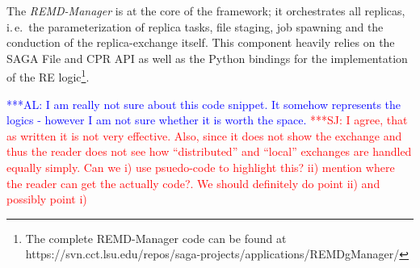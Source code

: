 \documentclass{rspublic}
\newcommand{\alnote}[1]{ {\textcolor{blue} { ***AL: #1 }}}
\newcommand{\jhanote}[1]{ {\textcolor{red} { ***SJ: #1 }}}
\newcommand{\alnote}[1]{}
\newcommand{\jhanote}[1]{}
\begin{document}
The \emph{REMD-Manager} is at the core of the framework; it
orchestrates all replicas, i.\,e.\ the parameterization of replica
tasks, file staging, job spawning and the conduction of the
replica-exchange itself. This component heavily relies on the SAGA
File and CPR API as well as the Python bindings for the implementation
of the RE logic\footnote{The complete REMD-Manager code can be found
  at
  https://svn.cct.lsu.edu/repos/saga-projects/applications/REMDgManager/}.

                                  
\alnote{I am really not sure about this code snippet. It somehow
  represents the logics - however I am not sure whether it is worth
  the space.} \jhanote{I agree, that as written it is not very
  effective. Also, since it does not show the exchange and thus the
  reader does not see how ``distributed'' and ``local'' exchanges are
  handled equally simply. Can we i) use psuedo-code to highlight this?
  ii) mention where the reader can get the actually code?. We should
  definitely do point ii) and possibly point i)}

\end{document}
